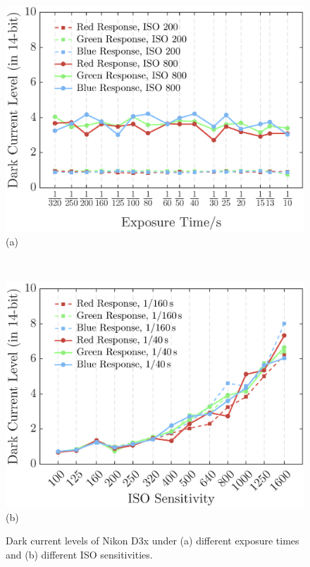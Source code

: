 \documentclass[9pt,twocolumn,twoside]{osajnl}
\begin{document}
	\begin{figure}[tbp]
		\centering
		\begin{minipage}{0.7\linewidth}
			\centering
			\includegraphics[width=\linewidth]{Fig1a}\\
			(a)
		\end{minipage}\\
		\vspace{0.5em}
		\begin{minipage}{0.7\linewidth}
			\centering
			\includegraphics[width=\linewidth]{Fig1b}\\
			(b)
		\end{minipage}
	\caption{Dark current levels of Nikon D3x under (a) different exposure times and (b) different ISO sensitivities.}
	\label{fig:1}
\end{figure}
\end{document}
